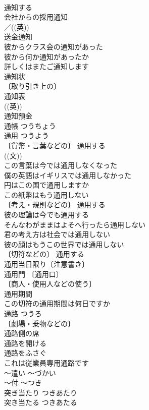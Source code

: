 \documentclass[8pt]{extreport}
\begin{document}
\begin{CJK}{UTF8}{min}
\\	通知する 
\\	会社からの採用通知 
\\	／((英))
\\	送金通知 
\\	彼からクラス会の通知があった 
\\	彼から何か通知があったか 
\\	詳しくはまたご通知します 
\\	通知状 
\\	〔取り引き上の〕
\\	通知表 
\\	((英)) 
\\	通知預金 
\\	通帳	つうちょう	
\\	通用	つうよう	
\\	〔貨幣・言葉などの〕 通用する 
\\	((文)) 
\\	この言葉は今では通用しなくなった 
\\	僕の英語はイギリスでは通用しなかった 
\\	円はこの国で通用しますか 
\\	この紙幣はもう通用しない 
\\	〔考え・規則などの〕 通用する 
\\	彼の理論は今でも通用する 
\\	そんなわがままはよそへ行ったら通用しない 
\\	君の考え方は社会では通用しない 
\\	彼の顔はもうこの世界では通用しない 
\\	〔切符などの〕 通用する 
\\	通用当日限り〔注意書き〕 
\\	通用門 〔通用口〕
\\	〔商人・使用人などの使う〕
\\	通用期間 
\\	この切符の通用期間は何日ですか 
\\	通路	つうろ	
\\	〔劇場・乗物などの〕
\\	通路側の席 
\\	通路を開ける 
\\	通路をふさぐ 
\\	これは従業員専用通路です 
\\	～遣い	～づかい	
\\	～付	～つき	
\\	突き当たり	つきあたり	
\\	突き当たる	つきあたる	

\end{CJK}
\end{document}
